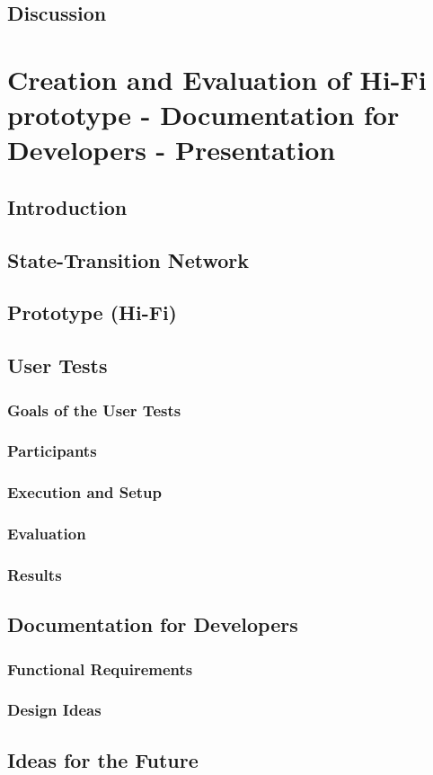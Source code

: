 \documentclass[11pt]{report}
\begin{document}
\section{Discussion}

\chapterfont{\LARGE \centering}
\chaptertitlefont{\Large \centering}
\chapter{Creation and Evaluation of  Hi-Fi prototype - Documentation for Developers - Presentation}

\section{Introduction}

\section{State-Transition Network}

\section{Prototype (Hi-Fi)}

\section{User Tests}

\subsection{Goals of the User Tests}

\subsection{Participants}

\subsection{Execution and Setup}

\subsection{Evaluation}

\subsection{Results}

\section{Documentation for Developers}

\subsection{Functional Requirements}

\subsection{Design Ideas}

\section{Ideas for the Future}

\printbibliography
\end{document}
